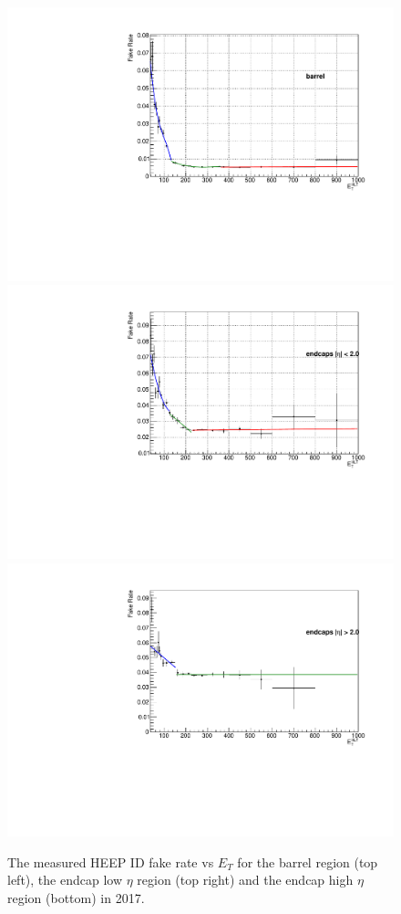 \begin{figure}[b]
  \begin{center}
\includegraphics[width=0.47\linewidth,angle=0]{figures/Zprime/2017/fakeRates/FakeRate_Barrel.pdf}
\includegraphics[width=0.47\linewidth,angle=0]{figures/Zprime/2017/fakeRates/EndCap_Eta_less2.pdf}
\includegraphics[width=0.47\linewidth,angle=0]{figures/Zprime/2017/fakeRates/Ext_Endcap.pdf}
    \caption{The measured HEEP ID fake rate vs $E_T$ for the barrel region (top left), the endcap low $\eta$ region (top right) and the endcap high $\eta$ region (bottom) in 2017.}
       \label{fr:fig:heepFRV70VsEt_2017}
  \end{center}
\end{figure}

